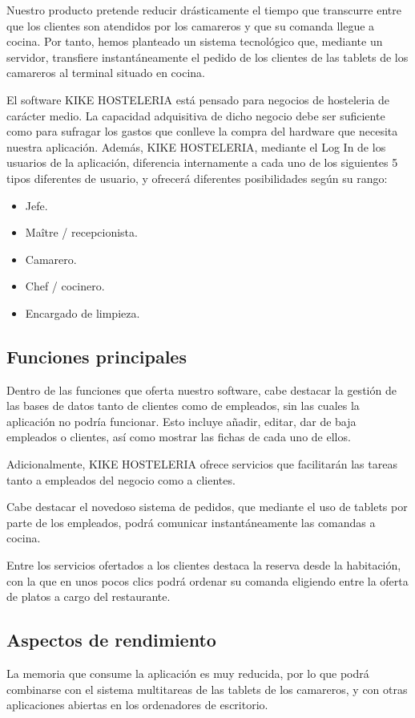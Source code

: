 \documentclass[spanish,a4paper,11pt, twoside]{report}	%
\begin{document}
Nuestro producto pretende reducir drásticamente el tiempo que transcurre entre que los clientes son atendidos por los camareros y que su comanda llegue a cocina. Por tanto, hemos planteado un sistema tecnológico que, mediante un servidor, transfiere instantáneamente el pedido de los clientes de las tablets de los camareros al terminal situado en cocina.

El software KIKE HOSTELERIA está pensado para negocios de hosteleria de carácter medio. La capacidad adquisitiva de dicho negocio debe ser suficiente como para sufragar los gastos que conlleve la compra del hardware que necesita nuestra aplicación.
Además, KIKE HOSTELERIA, mediante el Log In de los usuarios de la aplicación, diferencia internamente a cada uno de los siguientes 5 tipos diferentes de usuario, y  ofrecerá diferentes posibilidades según su rango:
	\begin{itemize}
		\item  Jefe.
		\item Maître / recepcionista.
		\item Camarero.
		\item Chef / cocinero.
		\item  Encargado de limpieza.
	\end {itemize}


		\subsection{Funciones principales} 

Dentro de las funciones  que oferta nuestro software, cabe destacar la gestión de las bases de datos tanto de clientes como de empleados, sin las cuales la aplicación no podría funcionar. Esto incluye añadir, editar, dar de baja empleados o clientes, así como mostrar las fichas de cada uno de ellos.

Adicionalmente, KIKE HOSTELERIA ofrece servicios que facilitarán las tareas tanto a empleados del negocio como a clientes. 

Cabe destacar el novedoso sistema de pedidos, que mediante el uso de tablets por parte de los empleados, podrá comunicar instantáneamente las comandas a cocina. 

Entre los servicios ofertados a los clientes destaca la reserva desde la habitación, con la que en unos pocos clics podrá ordenar su comanda eligiendo entre la oferta de platos a cargo del restaurante.



		\subsection{Aspectos de rendimiento}  La memoria que consume la aplicación es muy reducida, por lo que podrá combinarse con el sistema multitareas de las tablets de los camareros, y con otras aplicaciones abiertas en los ordenadores de escritorio.
\end{document}

